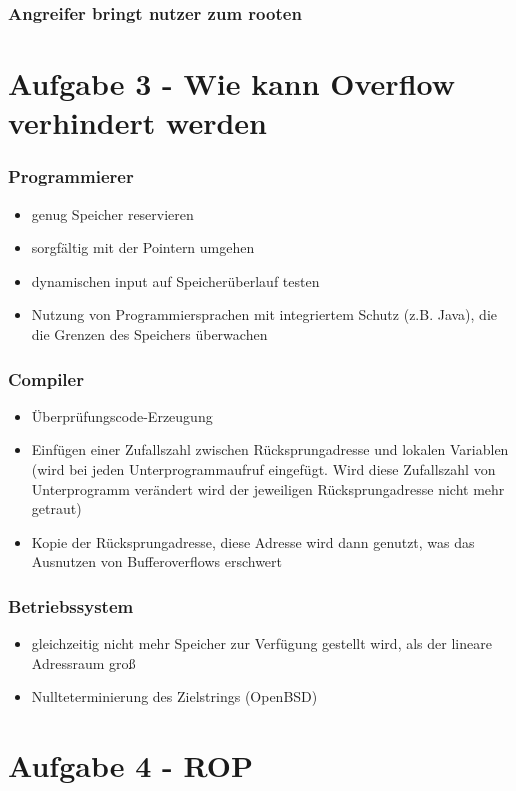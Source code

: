 \documentclass{scrartcl}
\begin{document}
\subsubsection{Angreifer bringt nutzer zum rooten}



\section*{Aufgabe 3 - Wie kann Overflow verhindert werden}
\subsubsection*{Programmierer}
  \begin{itemize}
    \item genug Speicher reservieren
    \item sorgfältig mit der Pointern umgehen
    \item dynamischen input auf Speicherüberlauf testen
    \item Nutzung von Programmiersprachen mit integriertem Schutz (z.B. Java),
      die die Grenzen des Speichers überwachen
  \end{itemize}

\subsubsection*{Compiler}
  \begin{itemize}
    \item Überprüfungscode-Erzeugung
    \item Einfügen einer Zufallszahl zwischen Rücksprungadresse und lokalen
      Variablen (wird bei jeden Unterprogrammaufruf eingefügt. Wird diese
      Zufallszahl von Unterprogramm verändert wird der jeweiligen
      Rücksprungadresse nicht mehr getraut)
    \item Kopie der Rücksprungadresse, diese Adresse wird dann genutzt, was das
      Ausnutzen von Bufferoverflows erschwert
  \end{itemize}
\subsubsection*{Betriebssystem}
  \begin{itemize}
    \item  gleichzeitig nicht mehr Speicher zur Verfügung gestellt wird, als der
      lineare Adressraum groß
    \item Nullteterminierung des Zielstrings (OpenBSD)
  \end{itemize}


\section*{Aufgabe 4 - ROP}
\end{document}
